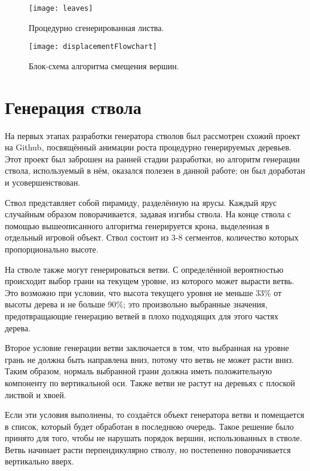 \begin{figure}[h]
    \centering
    \texttt{[image: leaves]}
    \caption{Процедурно сгенерированная листва.}
    \label{fig:leaves}
\end{figure}



\begin{figure}[h]
    \centering
    \texttt{[image: displacementFlowchart]}
    \caption{Блок-схема алгоритма смещения вершин.}
    \label{fig:displacementFlowchart}
\end{figure}

\section{Генерация ствола}
На первых этапах разработки генератора стволов был рассмотрен схожий проект\cite{hassank} на Github, посвящённый анимации роста процедурно генерируемых деревьев. Этот проект был заброшен на ранней стадии разработки, но алгоритм генерации ствола, используемый в нём, оказался полезен в данной работе; он был доработан и усовершенствован.

Ствол представляет собой пирамиду, разделённую на ярусы. Каждый ярус случайным образом поворачивается, задавая изгибы ствола. На конце ствола с помощью вышеописанного алгоритма генерируется крона, выделенная в отдельный игровой объект. Ствол состоит из 3-8 сегментов, количество которых пропорционально высоте.

На стволе также могут генерироваться ветви. С определённой вероятностью происходит выбор грани на текущем уровне, из которого может вырасти ветвь. Это возможно при условии, что высота текущего уровня не меньше 33\% от высоты дерева и не больше 90\%; это произвольно выбранные значения, предотвращающие генерацию ветвей в плохо подходящих для этого частях дерева. 

Второе условие генерации ветви заключается в том, что выбранная на уровне грань не должна быть направлена вниз, потому что ветвь не может расти вниз. Таким образом, нормаль выбранной грани должна иметь положительную компоненту по вертикальной оси. Также ветви не растут на деревьях с плоской листвой и хвоей.

Если эти условия выполнены, то создаётся объект генератора ветви и помещается в список, который будет обработан в последнюю очередь. Такое решение было принято для того, чтобы не нарушать порядок вершин, использованных в стволе. Ветвь начинает расти перпендикулярно стволу, но постепенно поворачивается вертикально вверх. 

